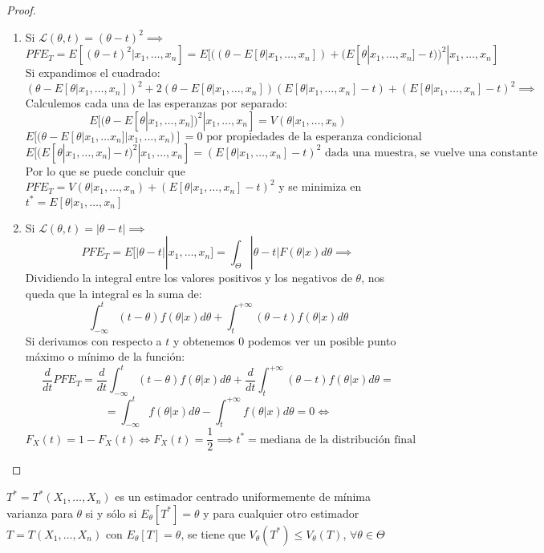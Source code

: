 \begin{proof}
  \begin{enumerate}
    \item Si $\mathcal{L}(\theta, t) = (\theta - t)^2 \implies$ $$PFE_T = E[(\theta - t)^2 | x_1, \ldots, x_n] = E[((\theta - E[\theta | x_1, \ldots, x_n]) + (E[\theta | x_1, \ldots, x_n] - t))^2 | x_1, \ldots, x_n] $$ Si expandimos el cuadrado: 
    $$ (\theta - E[\theta | x_1, \ldots, x_n])^2 + 2(\theta - E[\theta | x_1, \ldots, x_n])(E[\theta | x_1, \ldots, x_n] - t) + (E[\theta | x_1, \ldots, x_n] - t)^2 \implies$$
    Calculemos cada una de las esperanzas por separado: 
    $$E[(\theta - E[\theta | x_1, \ldots, x_n])^2 | x_1, \ldots, x_n] = V(\theta | x_1, \ldots, x_n)$$
    $$E[(\theta - E[\theta | x_1, \ldots x_n] | x_1, \ldots, x_n)] = 0 \text{ por propiedades de la esperanza condicional}$$
    $$E[(E[\theta | x_1, \ldots, x_n] - t)^2 | x_1, \ldots, x_n] = (E[\theta | x_1, \ldots, x_n] - t)^2 \text{ dada una muestra, se vuelve una constante}$$
    Por lo que se puede concluir que $PFE_T = V(\theta | x_1, \ldots, x_n) + (E[\theta | x_1, \ldots, x_n] - t)^2$ y se minimiza en $t^* = E[\theta | x_1, \ldots, x_n]$
    \item Si $\mathcal{L}(\theta, t) = |\theta - t| \implies$ $$PFE_T = E[|\theta - t| | x_1, \ldots, x_n] = \int_{\Theta} |\theta - t|F(\theta | x)d\theta \implies$$ Dividiendo la integral entre los valores positivos y los negativos de $\theta$, nos queda que la integral es la suma de: 
    $$\int_{-\infty}^{t} (t - \theta)f(\theta | x)d\theta + \int_{t}^{+\infty} (\theta - t)f(\theta | x)d\theta$$
    Si derivamos con respecto a $t$ y obtenemos $0$ podemos ver un posible punto máximo o mínimo de la función: 
    $$\frac{d}{dt}PFE_T = \frac{d}{dt} \int_{-\infty}^{t} (t - \theta)f(\theta | x)d\theta + \frac{d}{dt} \int_{t}^{+\infty} (\theta - t)f(\theta | x)d\theta = $$ $$ = \int_{-\infty}^{t} f(\theta | x)d\theta - \int_{t}^{+\infty} f(\theta | x)d\theta = 0 \iff$$
    $$F_X(t) = 1 - F_X(t) \iff F_X(t) = \frac{1}{2} \implies t^* = \text{mediana de la distribución final}$$
  \end{enumerate}
\end{proof}


\begin{definición}
  $T^{*} = T^{*}(X_1, \ldots, X_n)$ es un estimador centrado uniformemente de mínima varianza para $\theta$ si y sólo si $E_{\theta}[T^{*}] = \theta$ y para cualquier otro estimador $T = T(X_1, \ldots, X_n)$ con $E_{\theta}[T] = \theta$, se tiene que $V_{\theta}(T^{*}) \leq V_{\theta}(T)$, $\forall \theta \in \Theta$
\end{definición}


